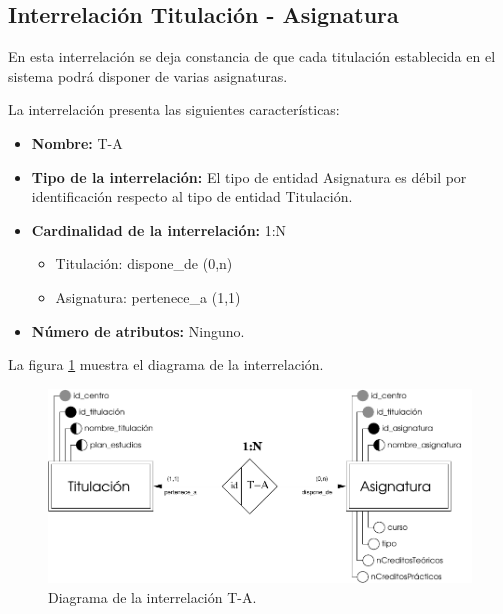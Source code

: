 \subsection{Interrelación Titulación - Asignatura}

   \begin{description}
      \item[Definición] En esta interrelación se deja constancia de que cada
      titulación establecida en el sistema podrá disponer de varias asignaturas.

      \item[Características] La interrelación presenta las siguientes
                             características:

         \begin{itemize}
            \item \textbf{Nombre:} T-A
            \item \textbf{Tipo de la interrelación:} El tipo de entidad
                  Asignatura es débil por identificación respecto al tipo de
                  entidad Titulación.
            \item \textbf{Cardinalidad de la interrelación:} 1:N
                  \begin{itemize}
                     \item Titulación: dispone\_de (0,n)
                     \item Asignatura: pertenece\_a (1,1)
                  \end{itemize}
            \item \textbf{Número de atributos:} Ninguno.
         \end{itemize}

      \item[Diagrama] La figura \ref{diagramaT-A} muestra el diagrama de la
                      interrelación.

      \item \begin{figure}[!ht]
            \begin{center}
            \includegraphics[]{07.Modelo_Entidad-Interrelacion/7.3.Analisis_Interrelaciones/diagramas/T-A.pdf}
            \caption{Diagrama de la interrelación T-A.}
            \label{diagramaT-A}
            \end{center}
         \end{figure}


\end{description}
